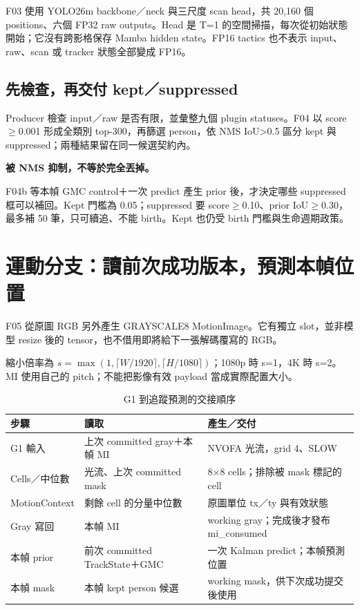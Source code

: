 \documentclass[UTF8,11pt,a4paper,fontset=none]{ctexart}
\begin{document}
F03 使用 YOLO26m backbone／neck 與三尺度 scan head，共 20,160 個 positions、六個 FP32 raw outputs。Head 是 T=1 的空間掃描，每次從初始狀態開始；它沒有跨影格保存 Mamba hidden state。FP16 tactics 也不表示 input、raw、scan 或 tracker 狀態全部變成 FP16。\cite{model}

\subsection*{先檢查，再交付 kept／suppressed}
Producer 檢查 input／raw 是否有限，並彙整九個 plugin statuses。F04 以 score\ensuremath{\ge}0.001 形成全類別 top-300，再篩選 person，依 NMS IoU>0.5 區分 kept 與 suppressed；兩種結果留在同一候選契約內。\cite{post}

\begin{finding}
\textbf{被 NMS 抑制，不等於完全丟掉。}\par
F04b 等本幀 GMC control＋一次 predict 產生 prior 後，才決定哪些 suppressed 框可以補回。Kept 門檻為 0.05；suppressed 要 score\ensuremath{\ge}0.10、prior IoU\ensuremath{\ge}0.30，最多補 50 筆，只可續追、不能 birth。Kept 也仍受 birth 門檻與生命週期政策。
\end{finding}

\clearpage
\section{運動分支：讀前次成功版本，預測本幀位置}
F05 從原圖 RGB 另外產生 GRAYSCALE8 MotionImage。它有獨立 slot，並非模型 resize 後的 tensor，也不借用即將給下一張解碼覆寫的 RGB。

縮小倍率為 $s=\max(1,\lceil W/1920\rceil,\lceil H/1080\rceil)$；1080p 時 s=1，4K 時 s=2。MI 使用自己的 pitch；不能把影像有效 payload 當成實際配置大小。

\begin{table}[H]
\caption{G1 到追蹤預測的交接順序}
\small
\begin{tabularx}{\textwidth}{@{}P{30mm}YY@{}}
\toprule
步驟 & 讀取 & 產生／交付 \\
\midrule
G1 輸入 & 上次 committed gray＋本幀 MI & NVOFA 光流，grid 4、SLOW \\
Cells／中位數 & 光流、上次 committed mask & 8×8 cells；排除被 mask 標記的 cell \\
MotionContext & 剩餘 cell 的分量中位數 & 原圖單位 tx／ty 與有效狀態 \\
Gray 寫回 & 本幀 MI & working gray；完成後才發布 mi\_consumed \\
本幀 prior & 前次 committed TrackState＋GMC & 一次 Kalman predict；本幀預測位置 \\
本幀 mask & 本幀 kept person 候選 & working mask，供下次成功提交後使用 \\
\bottomrule
\end{tabularx}
\end{table}
\end{document}
